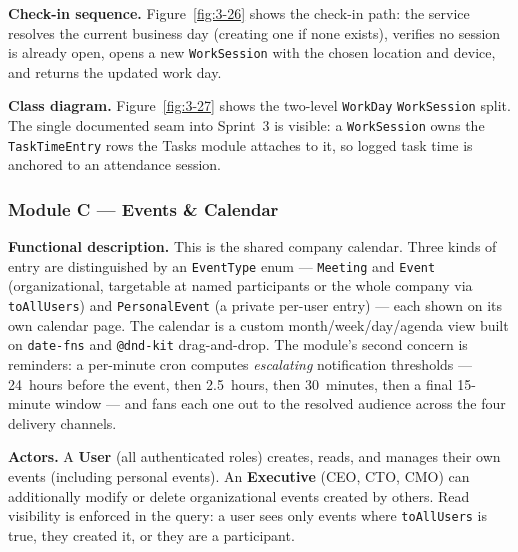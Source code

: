 \textbf{Check-in sequence.} Figure~\ref{fig:3-26} shows the check-in path: the service resolves
the current business day (creating one if none exists), verifies no session is already open,
opens a new \texttt{WorkSession} with the chosen location and device, and returns the updated
work day.


\textbf{Class diagram.} Figure~\ref{fig:3-27} shows the two-level \texttt{WorkDay} \textrightarrow{}
\texttt{WorkSession} split. The single documented seam into Sprint~3 is visible: a
\texttt{WorkSession} owns the \texttt{TaskTimeEntry} rows the Tasks module attaches to it, so
logged task time is anchored to an attendance session.

{\renewcommand{\figmaxheight}{0.60\textheight}%
}

\subsubsection{Module C --- Events \& Calendar}

\textbf{Functional description.} This is the shared company calendar. Three kinds of entry are
distinguished by an \texttt{EventType} enum --- \texttt{Meeting} and \texttt{Event}
(organizational, targetable at named participants or the whole company via \texttt{toAllUsers})
and \texttt{PersonalEvent} (a private per-user entry) --- each shown on its own calendar page.
The calendar is a custom month/week/day/agenda view built on \texttt{date-fns} and
\texttt{@dnd-kit} drag-and-drop. The module's second concern is reminders: a per-minute cron
computes \emph{escalating} notification thresholds --- 24~hours before the event, then
2.5~hours, then 30~minutes, then a final 15-minute window --- and fans each one out to the
resolved audience across the four delivery channels.

\textbf{Actors.} A \textbf{User} (all authenticated roles) creates, reads, and manages their own
events (including personal events). An \textbf{Executive} (CEO, CTO, CMO) can additionally
modify or delete organizational events created by others. Read visibility is enforced in the
query: a user sees only events where \texttt{toAllUsers} is true, they created it, or they are a
participant.

